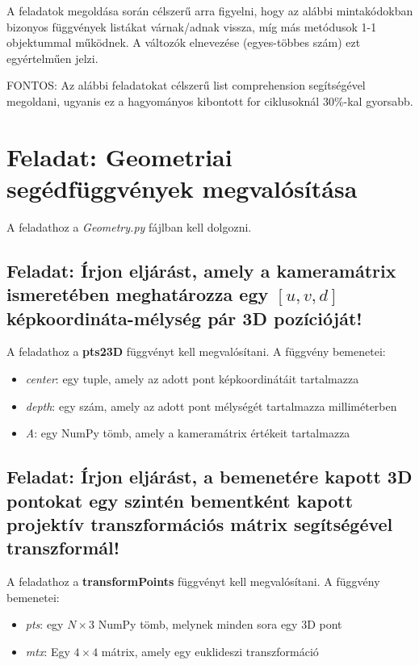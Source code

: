 \documentclass[12pt,a4paper,oneside]{report}             %
\begin{document}
A feladatok megoldása során célszerű arra figyelni, hogy az alábbi mintakódokban bizonyos függvények listákat várnak/adnak vissza, míg más metódusok 1-1 objektummal működnek. A változók elnevezése (egyes-többes szám) ezt egyértelműen jelzi.

FONTOS: Az alábbi feladatokat célszerű list comprehension segítségével megoldani, ugyanis ez a hagyományos kibontott for ciklusoknál 30\%-kal gyorsabb.

\section{Feladat: Geometriai segédfüggvények megvalósítása}

A feladathoz a \emph{Geometry.py} fájlban kell dolgozni.

\subsection{Feladat: Írjon eljárást, amely a kameramátrix ismeretében meghatározza egy $[u, v, d]$ képkoordináta-mélység pár 3D pozícióját!}

A feladathoz a \textbf{pts23D} függvényt kell megvalósítani. A függvény bemenetei: 
\begin{itemize}
\item \emph{center}: egy tuple, amely az adott pont képkoordinátáit tartalmazza
\item \emph{depth}: egy szám, amely az adott pont mélységét tartalmazza milliméterben
\item \emph{A}: egy NumPy tömb, amely a kameramátrix értékeit tartalmazza
\end{itemize}

\subsection{Feladat: Írjon eljárást, a bemenetére kapott 3D pontokat egy szintén bementként kapott projektív transzformációs mátrix segítségével transzformál!}

A feladathoz a \textbf{transformPoints} függvényt kell megvalósítani. A függvény bemenetei: 
\begin{itemize}
	\item \emph{pts}: egy $N\times 3$ NumPy tömb, melynek minden sora egy 3D pont
	\item \emph{mtx}: Egy $4\times 4$ mátrix, amely egy euklideszi transzformáció
\end{itemize}
\end{document}
